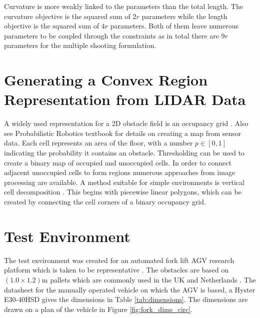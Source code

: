 Curvature is more weakly linked to the parameters than the total length. The curvature objective is the squared sum of $2r$ parameters while the length objective is the squared sum of $4r$ parameters. Both of them leave numerous parameters to be coupled through the constraints as in total there are $9r$ parameters for the multiple shooting formulation. 

\section{Generating a Convex Region Representation from LIDAR Data}
A widely used representation for a 2D obstacle field is an occupancy grid \cite{Thrun1996}. Also see Probabilistic Robotics textbook \cite{thrun2005probabilistic} for details on creating a map from sensor data. Each cell represents an area of the floor, with a number $p\in[0,1]$ indicating the probability it contains an obstacle. Thresholding can be used to create a binary map of occupied and unoccupied cells. In order to connect adjacent unoccupied cells to form regions numerous approaches from image processing are available. A method suitable for simple environments is vertical cell decomposition \cite{LaValle2006c}. This begins with piecewise linear polygons, which can be created by connecting the cell corners of a binary occupancy grid.


\section{Test Environment}
The test environment was created for an automated fork lift AGV research platform which is taken to be representative \cite{Baird2018}. The obstacles are based on $(1.0 \times 1.2)$m pallets which are commonly used in the UK and Netherlands \cite{Raballand2005}. The datasheet for the manually operated vehicle on which the AGV is based, a Hyster E30-40HSD gives the dimensions in Table \ref{tab:dimensions}. The dimensions are drawn on a plan of the vehicle in Figure \ref{fig:fork_dims_circ}.

